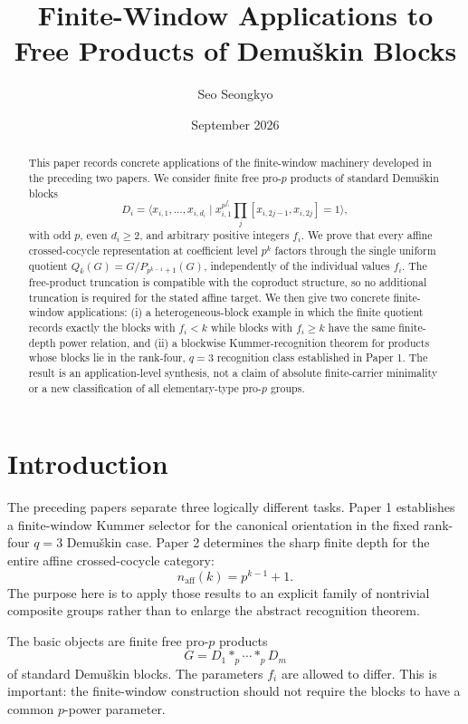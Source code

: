 \documentclass[11pt]{article}
\title{Finite-Window Applications to Free Products of Demuškin Blocks}
\author{Seo Seongkyo}
\date{September 2026}
\begin{document}
\maketitle

\begin{abstract}
This paper records concrete applications of the finite-window machinery developed in the preceding two papers. We consider finite free pro-$p$ products of standard Demuškin blocks
\[
D_i=\langle x_{i,1},\ldots,x_{i,d_i}\mid
x_{i,1}^{p^{f_i}}\prod_j[x_{i,2j-1},x_{i,2j}]=1\rangle ,
\]
with odd $p$, even $d_i\ge2$, and arbitrary positive integers $f_i$. We prove that every affine crossed-cocycle representation at coefficient level $p^k$ factors through the single uniform quotient
$Q_k(G)=G/P_{p^{k-1}+1}(G)$, independently of the individual values $f_i$. The free-product truncation is compatible with the coproduct structure, so no additional truncation is required for the stated affine target. We then give two concrete finite-window applications: (i) a heterogeneous-block example in which the finite quotient records exactly the blocks with $f_i<k$ while blocks with $f_i\ge k$ have the same finite-depth power relation, and (ii) a blockwise Kummer-recognition theorem for products whose blocks lie in the rank-four, $q=3$ recognition class established in Paper 1. The result is an application-level synthesis, not a claim of absolute finite-carrier minimality or a new classification of all elementary-type pro-$p$ groups.
\end{abstract}

\section{Introduction}

The preceding papers separate three logically different tasks. Paper 1 establishes a finite-window Kummer selector for the canonical orientation in the fixed rank-four $q=3$ Demuškin case. Paper 2 determines the sharp finite depth for the entire affine crossed-cocycle category:
\[
n_{\mathrm{aff}}(k)=p^{k-1}+1.
\]
The purpose here is to apply those results to an explicit family of nontrivial composite groups rather than to enlarge the abstract recognition theorem.

The basic objects are finite free pro-$p$ products
\[
G=D_1*_p\cdots *_pD_m
\]
of standard Demuškin blocks. The parameters $f_i$ are allowed to differ. This is important: the finite-window construction should not require the blocks to have a common $p$-power parameter.
\end{document}
